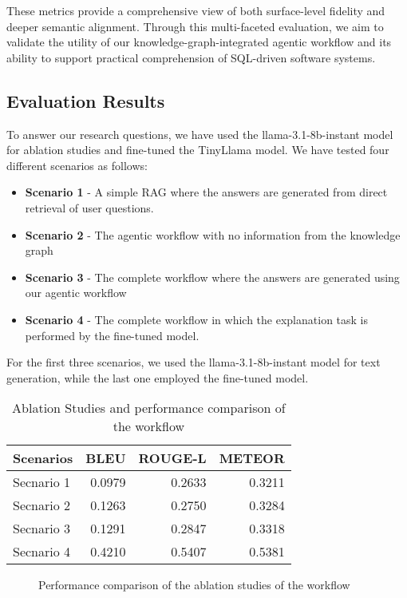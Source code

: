 \documentclass[11pt]{article}
\begin{document}
These metrics provide a comprehensive view of both surface-level fidelity and deeper semantic alignment. Through this multi-faceted evaluation, we aim to validate the utility of our knowledge-graph-integrated agentic workflow and its ability to support practical comprehension of SQL-driven software systems.


\subsection{Evaluation Results}
To answer our research questions, we have used the llama-3.1-8b-instant model for ablation studies and fine-tuned the TinyLlama model. We have tested four different scenarios as follows:
\begin{itemize}
    \item \textbf{Scenario 1} - A simple RAG where the answers are generated from direct retrieval of user questions.
    \item \textbf{Scenario 2} - The agentic workflow with no information from the knowledge graph
    \item \textbf{Scenario 3} - The complete workflow where the answers are generated using our agentic workflow
    \item \textbf{Scenario 4} - The complete workflow in which the explanation task is performed by the fine-tuned model.
\end{itemize}

For the first three scenarios, we used the llama-3.1-8b-instant model for text generation, while the last one employed the fine-tuned model.  

\begin{table}[ht]
\centering
\begin{tabular}{lrrr}
\toprule
\textbf{Scenarios} & \textbf{BLEU} & \textbf{ROUGE-L} & \textbf{METEOR} \\
\midrule
Secnario 1 & 0.0979 & 0.2633 & 0.3211 \\
Secnario 2 & 0.1263 & 0.2750 & 0.3284 \\
Secnario 3 & 0.1291 & 0.2847 & 0.3318 \\
Secnario 4 & 0.4210 & 0.5407 & 0.5381 \\
\bottomrule
\end{tabular}
\centering
\caption{Ablation Studies and performance comparison of the workflow}
\label{tab:model-scores}
\end{table}


\begin{figure}[h]
\centering
\setlength\fboxrule{1pt}  %
\setlength\fboxsep{0pt}   %
\caption{Performance comparison of the ablation studies of the workflow }
\label{fig:eval_score}
\end{figure}
\end{document}
